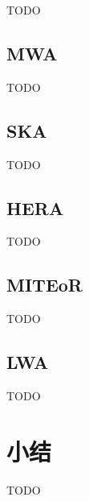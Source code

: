 TODO

\subsection{MWA}

TODO

\subsection{SKA}

TODO

\subsection{HERA}

TODO

\subsection{MITEoR}

TODO

\subsection{LWA}

TODO


\section{小结}

TODO


